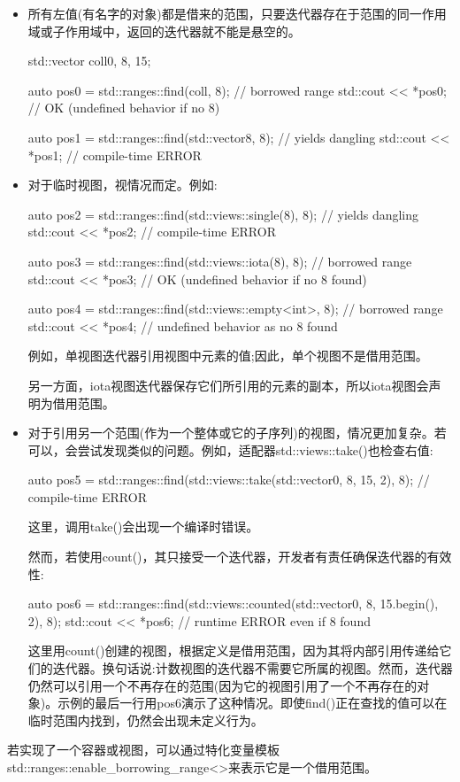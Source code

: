 \begin{itemize}
\item
所有左值(有名字的对象)都是借来的范围，只要迭代器存在于范围的同一作用域或子作用域中，返回的迭代器就不能是悬空的。

\begin{cpp}
std::vector coll{0, 8, 15};

auto pos0 = std::ranges::find(coll, 8); // borrowed range
std::cout << *pos0; // OK (undefined behavior if no 8)

auto pos1 = std::ranges::find(std::vector{8}, 8); // yields dangling
std::cout << *pos1; // compile-time ERROR
\end{cpp}

\item
对于临时视图，视情况而定。例如:

\begin{cpp}
auto pos2 = std::ranges::find(std::views::single(8), 8); // yields dangling
std::cout << *pos2; // compile-time ERROR

auto pos3 = std::ranges::find(std::views::iota(8), 8); // borrowed range
std::cout << *pos3; // OK (undefined behavior if no 8 found)

auto pos4 = std::ranges::find(std::views::empty<int>, 8); // borrowed range
std::cout << *pos4; // undefined behavior as no 8 found
\end{cpp}

例如，单视图迭代器引用视图中元素的值;因此，单个视图不是借用范围。

另一方面，iota视图迭代器保存它们所引用的元素的副本，所以iota视图会声明为借用范围。

\item
对于引用另一个范围(作为一个整体或它的子序列)的视图，情况更加复杂。若可以，会尝试发现类似的问题。例如，适配器std::views::take()也检查右值:

\begin{cpp}
auto pos5 = std::ranges::find(std::views::take(std::vector{0, 8, 15}, 2), 8);
// compile-time ERROR
\end{cpp}

这里，调用take()会出现一个编译时错误。

然而，若使用count()，其只接受一个迭代器，开发者有责任确保迭代器的有效性:

\begin{cpp}
auto pos6 = std::ranges::find(std::views::counted(std::vector{0, 8, 15}.begin(),
							2), 8);
std::cout << *pos6; // runtime ERROR even if 8 found
\end{cpp}

这里用count()创建的视图，根据定义是借用范围，因为其将内部引用传递给它们的迭代器。换句话说:计数视图的迭代器不需要它所属的视图。然而，迭代器仍然可以引用一个不再存在的范围(因为它的视图引用了一个不再存在的对象)。示例的最后一行用pos6演示了这种情况。即使find()正在查找的值可以在临时范围内找到，仍然会出现未定义行为。

\end{itemize}

若实现了一个容器或视图，可以通过特化变量模板std::ranges::enable\_borrowing\_range<>来表示它是一个借用范围。








